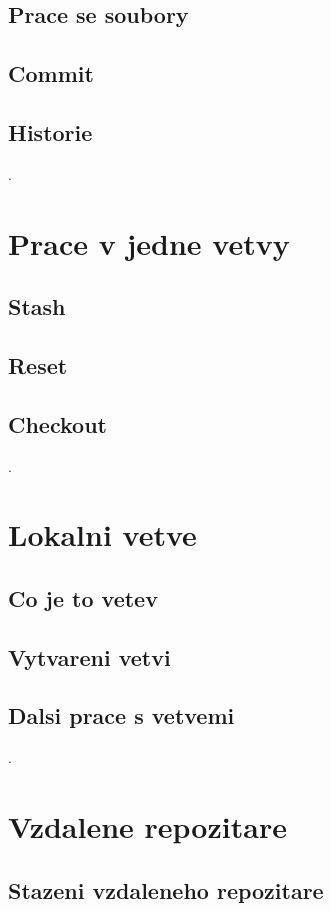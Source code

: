 \documentclass[11pt]{article}
\begin{document}
\subsection{Prace se soubory}
\subsection{Commit}
\subsection{Historie}

.

\section{Prace v jedne vetvy}
\subsection{Stash}
\subsection{Reset}
\subsection{Checkout}

.

\section{Lokalni vetve}
\subsection{Co je to vetev}
\subsection{Vytvareni vetvi}
\subsection{Dalsi prace s vetvemi}

.

\section{Vzdalene repozitare}
\subsection{Stazeni vzdaleneho repozitare}
\end{document}
